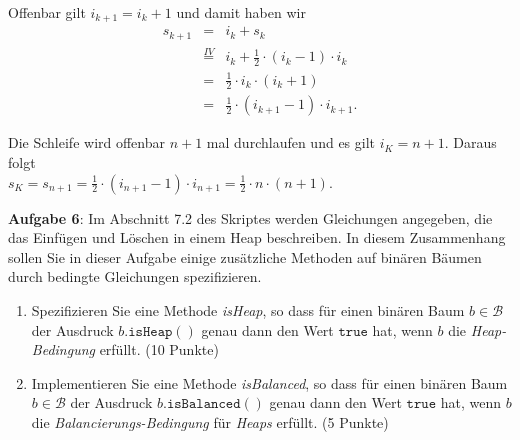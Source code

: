 \documentclass{article}
\begin{document}
\begin{enumerate}
\begin{enumerate}
            Offenbar gilt $i_{k+1} = i_k + 1$ und damit haben wir 
            \begin{eqnarray*}
              s_{k+1} & = & i_k + s_k \\
            & \stackrel{IV}{=} & i_k + \frac{1}{2} \cdot (i_{k}-1) \cdot i_k \\
            & = & \frac{1}{2} \cdot i_{k} \cdot (i_k + 1) \\
            & = & \frac{1}{2} \cdot (i_{k+1} - 1) \cdot i_{k+1}.
            \end{eqnarray*}
      \end{enumerate}
      Die Schleife wird offenbar $n+1$ mal durchlaufen und es gilt $i_K = n+1$.  Daraus folgt
      \\[0.2cm]
      \hspace*{1.3cm}
      $s_K = s_{n+1} = \frac{1}{2} \cdot (i_{n+1} - 1) \cdot i_{n+1} = \frac{1}{2} \cdot n \cdot (n+1)$.
\end{enumerate}
\vspace{0.3cm}

\noindent
\textbf{Aufgabe 6}:  Im Abschnitt 7.2 des Skriptes
werden Gleichungen angegeben, die das Einf\"ugen und L\"oschen in einem Heap beschreiben.
In diesem Zusammenhang sollen Sie in dieser Aufgabe  einige zus\"atzliche Methoden auf
bin\"aren B\"aumen durch bedingte Gleichungen spezifizieren.
\begin{enumerate}
\item Spezifizieren Sie eine Methode \textsl{isHeap}, so
      dass f\"ur einen bin\"aren Baum $b \in \mathcal{B}$ der Ausdruck 
      $b.\mathtt{isHeap}()$ genau dann den Wert $\mathtt{true}$ hat, wenn $b$ die
      \emph{Heap-Bedingung} erf\"ullt.  \hspace*{\fill} (10 Punkte)
\item Implementieren Sie eine Methode \textsl{isBalanced}, so
      dass f\"ur einen bin\"aren Baum $b \in \mathcal{B}$ der Ausdruck 
      $b.\mathtt{isBalanced}()$ genau dann den Wert $\mathtt{true}$ hat, wenn $b$ die
      \emph{Balancierungs-Bedingung} f\"ur \emph{Heaps} erf\"ullt.  
      \hspace*{\fill} (5 Punkte)
\end{enumerate}
\vspace{0.3cm}
\end{document}
